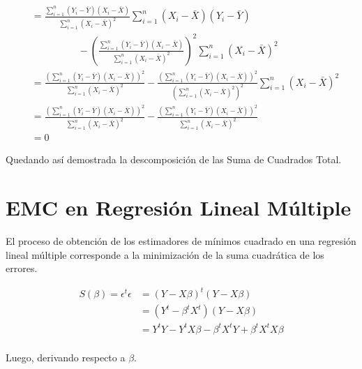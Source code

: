 \documentclass[
  11pt,
]{book}
\theoremstyle{definition}
\theoremstyle{definition}
\theoremstyle{definition}
\theoremstyle{definition}
\theoremstyle{remark}
\begin{document}
\begin{equation}
\begin{split}
&= \frac{\displaystyle\sum_{i=1}^n (Y_i - \bar{Y})(X_i - \bar{X})}{\displaystyle\sum_{i=1}^n(X_i -\bar{X})^2}\sum_{i=1}^n\left(X_i -\bar{X} \right) \left( Y_i - \bar{Y}\right)\\
& \hspace{2cm} - \left( \frac{\displaystyle\sum_{i=1}^n (Y_i - \bar{Y})(X_i - \bar{X})}{\displaystyle\sum_{i=1}^n(X_i -\bar{X})^2} \right)^2\sum_{i=1}^n\left(X_i -\bar{X} \right)^2 \\
&= \frac{\left(\displaystyle\sum_{i=1}^n (Y_i - \bar{Y})(X_i - \bar{X})\right)^2}{\displaystyle\sum_{i=1}^n(X_i -\bar{X})^2} - \frac{\left( \displaystyle\sum_{i=1}^n (Y_i - \bar{Y})(X_i - \bar{X})\right)^2}{\left(\displaystyle\sum_{i=1}^n(X_i -\bar{X})^2\right)^2} \sum_{i=1}^n\left(X_i -\bar{X} \right)^2 \\
&= \frac{\left(\displaystyle\sum_{i=1}^n (Y_i - \bar{Y})(X_i - \bar{X})\right)^2}{\displaystyle\sum_{i=1}^n(X_i -\bar{X})^2} - \frac{\left( \displaystyle\sum_{i=1}^n (Y_i - \bar{Y})(X_i - \bar{X})\right)^2}{\displaystyle\sum_{i=1}^n(X_i -\bar{X})^2}\\
& = 0
\end{split}
\label{eq:demostracionSCT5}
\end{equation}

Quedando así demostrada la descomposición de las Suma de Cuadrados Total.

\section{EMC en Regresión Lineal Múltiple}\label{RLM-EMC}

El proceso de obtención de los estimadores de mínimos cuadrado en una regresión lineal múltiple corresponde a la minimización de la suma cuadrática de los errores.

\begin{equation}
\begin{split}
S(\beta) = \epsilon^t\epsilon &= (Y - X\beta)^t(Y - X\beta)\\
&= (Y^t - \beta^tX^t)(Y - X\beta)\\
&= Y^tY - Y^tX\beta - \beta^tX^tY + \beta^tX^tX\beta\\
\end{split}
\label{eq:betasmultiple-demostracion}
\end{equation}

Luego, derivando respecto a \(\beta\).
\end{document}
